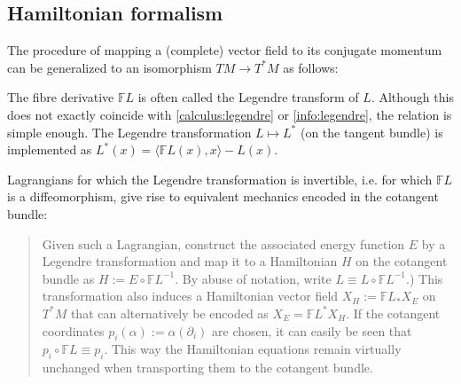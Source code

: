 \subsection{Hamiltonian formalism}

    The procedure of mapping a (complete) vector field to its conjugate momentum can be generalized to an isomorphism $TM\rightarrow T^*M$ as follows:
    \begin{remark}
        The fibre derivative $\mathbb{F}L$ is often called the Legendre transform of $L$. Although this does not exactly coincide with \ref{calculus:legendre} or \eqref{info:legendre}, the relation is simple enough. The Legendre transformation $L\mapsto L^*$ (on the tangent bundle) is implemented as $L^*(x) = \langle\mathbb{F}L(x),x\rangle - L(x)$.
    \end{remark}
    Lagrangians for which the Legendre transformation is invertible, i.e. for which $\mathbb{F}L$ is a diffeomorphism, give rise to equivalent mechanics encoded in the cotangent bundle:
    \begin{quote}
        Given such a Lagrangian, construct the associated energy function $E$ by a Legendre transformation and map it to a Hamiltonian $H$ on the cotangent bundle as $H:=E\circ\mathbb{F}L^{-1}$. By abuse of notation, write $L\equiv L\circ\mathbb{F}L^{-1}$.) This transformation also induces a Hamiltonian vector field $X_H:=\mathbb{F}L_*X_E$ on $T^*M$ that can alternatively be encoded as $X_E=\mathbb{F}L^*X_H$. If the cotangent coordinates $p_i(\alpha) := \alpha(\partial_i)$ are chosen, it can easily be seen that $p_i\circ\mathbb{F}L\equiv p_i$. This way the Hamiltonian equations remain virtually unchanged when transporting them to the cotangent bundle.
    \end{quote}
